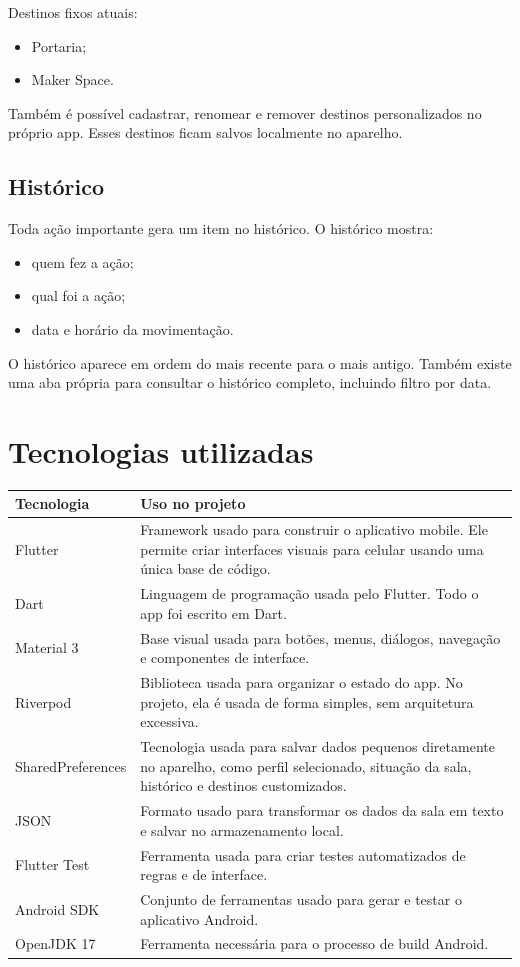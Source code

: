 \documentclass[12pt,a4paper]{article}
\begin{document}
Destinos fixos atuais:

\begin{itemize}
    \item Portaria;
    \item Maker Space.
\end{itemize}

Também é possível cadastrar, renomear e remover destinos personalizados no próprio app. Esses destinos ficam salvos localmente no aparelho.

\subsection{Histórico}

Toda ação importante gera um item no histórico. O histórico mostra:

\begin{itemize}
    \item quem fez a ação;
    \item qual foi a ação;
    \item data e horário da movimentação.
\end{itemize}

O histórico aparece em ordem do mais recente para o mais antigo. Também existe uma aba própria para consultar o histórico completo, incluindo filtro por data.

\section{Tecnologias utilizadas}

\begin{longtable}{|p{4cm}|p{9cm}|}
\hline
\textbf{Tecnologia} & \textbf{Uso no projeto} \\
\hline
Flutter & Framework usado para construir o aplicativo mobile. Ele permite criar interfaces visuais para celular usando uma única base de código. \\
\hline
Dart & Linguagem de programação usada pelo Flutter. Todo o app foi escrito em Dart. \\
\hline
Material 3 & Base visual usada para botões, menus, diálogos, navegação e componentes de interface. \\
\hline
Riverpod & Biblioteca usada para organizar o estado do app. No projeto, ela é usada de forma simples, sem arquitetura excessiva. \\
\hline
SharedPreferences & Tecnologia usada para salvar dados pequenos diretamente no aparelho, como perfil selecionado, situação da sala, histórico e destinos customizados. \\
\hline
JSON & Formato usado para transformar os dados da sala em texto e salvar no armazenamento local. \\
\hline
Flutter Test & Ferramenta usada para criar testes automatizados de regras e de interface. \\
\hline
Android SDK & Conjunto de ferramentas usado para gerar e testar o aplicativo Android. \\
\hline
OpenJDK 17 & Ferramenta necessária para o processo de build Android. \\
\hline
\end{longtable}
\end{document}
